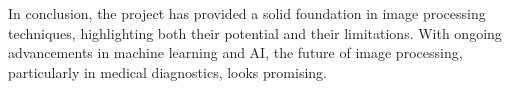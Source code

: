 \documentclass[%
	a4paper, %
	12pt, %
	english, %
	bibtotoc %
]{scrartcl}
\begin{document}
In conclusion, the project has provided a solid foundation in image processing techniques, highlighting both their potential and their limitations. With ongoing advancements in machine learning and AI, the future of image processing, particularly in medical diagnostics, looks promising.




\newpage


\end{document}
